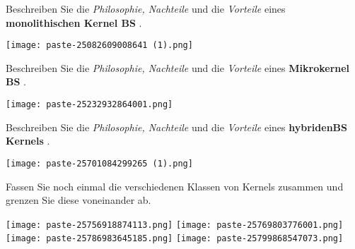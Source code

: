 \documentclass{article}
\begin{document}
\begin{tcolorbox}[colback=white!10!white,colframe=lightgray!75!black,
  savelowerto=\jobname_ex.tex]

\begin{center}
Beschreiben Sie die 
\textit{Philosophie, Nachteile
}und die 
\textit{Vorteile
}eines 
\textbf{monolithischen Kernel BS
}.

\end{center}

\tcblower

\justifying
\texttt{[image: paste-25082609008641 (1).png]}

\end{tcolorbox}
\begin{tcolorbox}[colback=white!10!white,colframe=lightgray!75!black,
  savelowerto=\jobname_ex.tex]

\begin{center}
Beschreiben Sie die
\textit{Philosophie, Nachteile
}und die
\textit{Vorteile
}eines
\textbf{Mikrokernel BS
}.

\end{center}

\tcblower

\justifying
\texttt{[image: paste-25232932864001.png]}

\end{tcolorbox}
\begin{tcolorbox}[colback=white!10!white,colframe=lightgray!75!black,
  savelowerto=\jobname_ex.tex]

\begin{center}
Beschreiben Sie die
\textit{Philosophie, Nachteile
}und die
\textit{Vorteile
}eines 
\textbf{hybridenBS Kernels
}.

\end{center}

\tcblower

\justifying
\texttt{[image: paste-25701084299265 (1).png]}

\end{tcolorbox}
\begin{tcolorbox}[colback=white!10!white,colframe=lightgray!75!black,
  savelowerto=\jobname_ex.tex]

\begin{center}
Fassen Sie noch einmal die verschiedenen Klassen von Kernels zusammen und grenzen Sie diese voneinander ab.

\end{center}

\tcblower

\justifying
\texttt{[image: paste-25756918874113.png]}
\texttt{[image: paste-25769803776001.png]}
\texttt{[image: paste-25786983645185.png]}
\texttt{[image: paste-25799868547073.png]}

\end{tcolorbox}
\end{document}
